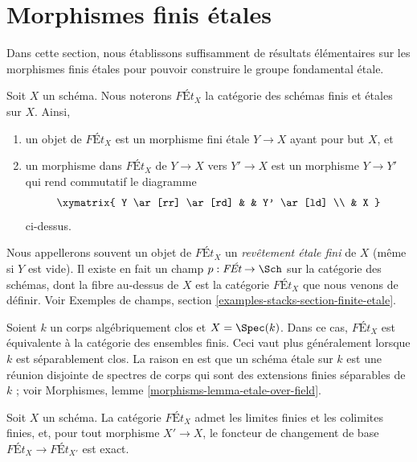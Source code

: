 \section{Morphismes finis \'etales}
\label{section-finite-etale}

\noindent
Dans cette section, nous établissons suffisamment de résultats élémentaires sur les morphismes finis \'etales
pour pouvoir construire le groupe fondamental \'etale.

\medskip\noindent
Soit $X$ un schéma. Nous noterons $\textit{F\'Et}_X$
la catégorie des schémas finis et \'etales sur $X$.
Ainsi,
\begin{enumerate}
\item un objet de $\textit{F\'Et}_X$ est un morphisme fini \'etale
$Y \to X$ ayant pour but $X$, et
\item un morphisme dans $\textit{F\'Et}_X$
de $Y \to X$ vers $Y' \to X$ est un morphisme $Y \to Y'$ qui rend
commutatif le diagramme
$$
\xymatrix{
Y \ar[rr] \ar[rd] & &  Y' \ar[ld] \\
& X
}
$$
ci-dessus.
\end{enumerate}
Nous appellerons souvent un objet de $\textit{F\'Et}_X$ un
{\it revêtement \'etale fini} de $X$ (même si $Y$ est vide).
Il existe en fait un champ $p : \textit{F\'Et} \to \Sch$
sur la catégorie des schémas, dont la fibre au-dessus de $X$ est la catégorie
$\textit{F\'Et}_X$ que nous venons de définir. Voir Exemples de champs, section
\ref{examples-stacks-section-finite-etale}.

\begin{example}
\label{example-finite-etale-geometric-point}
Soient $k$ un corps algébriquement clos et $X = \Spec(k)$. Dans ce cas,
$\textit{F\'Et}_X$ est équivalente à la catégorie des ensembles finis. Ceci vaut
plus généralement lorsque $k$ est séparablement clos. La raison en est que
un schéma \'etale sur $k$ est une réunion disjointe de spectres de
corps qui sont des extensions finies séparables de $k$ ; voir
Morphismes, lemme \ref{morphisms-lemma-etale-over-field}.
\end{example}

\begin{lemma}
\label{lemma-finite-etale-covers-limits-colimits}
Soit $X$ un schéma. La catégorie $\textit{F\'Et}_X$ admet les limites finies et
les colimites finies, et, pour tout morphisme $X' \to X$, le foncteur de changement de base
$\textit{F\'Et}_X \to \textit{F\'Et}_{X'}$ est exact.
\end{lemma}

